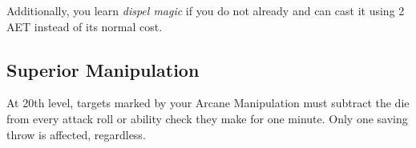 Additionally, you learn \textit{dispel magic} if you do not already and can cast it using 2 AET instead of its normal cost.

\subsection{Superior Manipulation}

At 20th level, targets marked by your Arcane Manipulation must subtract the die from every attack roll or ability check they make for one minute. Only one saving throw is affected, regardless.

